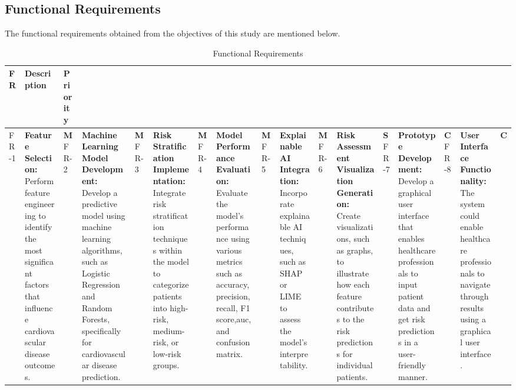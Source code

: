 \subsection{Functional Requirements}
\label{sec:dev_bck}
The functional requirements obtained from the objectives of this study are mentioned below. 
\begin{longtable}{|p{2.5cm}|p{9cm}|p{2cm}|}
\hline
\textbf{FR} & \textbf{Description} & \textbf{Priority} \\
\hline
FR-1 & \textbf{Feature Selection: }
Perform feature engineering to identify the most significant factors that influence cardiovascular disease outcomes. & \textbf{M} 
\hline
FR-2 & \textbf{Machine Learning Model Development: }
Develop a predictive model using machine learning algorithms, such as Logistic Regression and Random Forests, specifically for cardiovascular disease prediction. & \textbf{M} 
\hline
FR-3 & \textbf{Risk Stratification Implementation: }
Integrate risk stratification techniques within the model to categorize patients into high-risk, medium-risk, or low-risk groups. & \textbf{M}  \hline
FR-4 & \textbf{Model Performance Evaluation: }
Evaluate the model’s performance using various metrics such as accuracy, precision, recall, F1 score,\gls{auc}, and confusion matrix. & \textbf{M}  \hline \hline
FR-5 & \textbf{Explainable AI Integration: }
Incorporate explainable AI techniques, such as SHAP or LIME to assess the model's interpretability. & \textbf{M} 
\hline
FR-6 &\textbf{ Risk Assessment Visualization Generation: }
Create visualizations, such as graphs, to illustrate how each feature contributes to the risk predictions for individual patients. & \textbf{S} 
\hline
FR-7 & \textbf{Prototype Development: }
Develop a graphical user interface that enables healthcare professionals to input patient data and get risk predictions in a user-friendly manner. & \textbf{C} 
\hline
FR-8 & \textbf{User Interface Functionality: }
The system could enable healthcare professionals to navigate through results using a graphical user interface. & \textbf{C} 
\hline
\caption{Functional Requirements}
\end{longtable}

